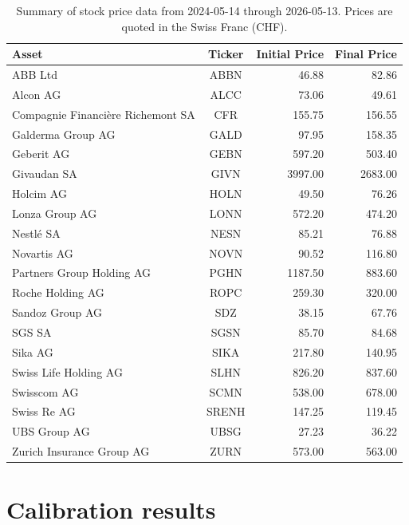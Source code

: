 \endgroup

\begin{table}[h]
    \centering
    \begin{tabular}{lcrr}
        \toprule
        Asset & Ticker & Initial Price & Final Price \\
        \midrule
        ABB Ltd & ABBN & 46.88 & 82.86 \\
        Alcon AG & ALCC & 73.06 & 49.61 \\
        Compagnie Financière Richemont SA & CFR & 155.75 & 156.55 \\
        Galderma Group AG & GALD & 97.95 & 158.35 \\
        Geberit AG & GEBN & 597.20 & 503.40 \\
        Givaudan SA & GIVN & 3997.00 & 2683.00 \\
        Holcim AG & HOLN & 49.50 & 76.26 \\
        Lonza Group AG & LONN & 572.20 & 474.20 \\
        Nestlé SA & NESN & 85.21 & 76.88 \\
        Novartis AG & NOVN & 90.52 & 116.80 \\
        Partners Group Holding AG & PGHN & 1187.50 & 883.60 \\
        Roche Holding AG & ROPC & 259.30 & 320.00 \\
        Sandoz Group AG & SDZ & 38.15 & 67.76 \\
        SGS SA & SGSN & 85.70 & 84.68 \\
        Sika AG & SIKA & 217.80 & 140.95 \\
        Swiss Life Holding AG & SLHN & 826.20 & 837.60 \\
        Swisscom AG & SCMN & 538.00 & 678.00 \\
        Swiss Re AG & SRENH & 147.25 & 119.45 \\
        UBS Group AG & UBSG & 27.23 & 36.22 \\
        Zurich Insurance Group AG & ZURN & 573.00 & 563.00 \\
        \bottomrule
    \end{tabular}
    \caption{Summary of stock price data from 2024-05-14 through 2026-05-13. Prices are quoted in the Swiss Franc (CHF).}
    \label{tab: stock data}
\end{table}

\section{Calibration results}
\label{appendix: calibration results}
